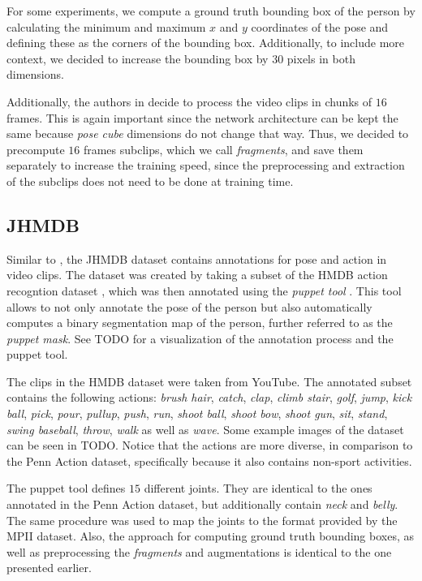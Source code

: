 For some experiments, we compute a ground truth bounding box of the person by calculating the minimum and maximum $x$ and $y$ coordinates of the pose and defining these as the corners of the bounding box.
Additionally, to include more context, we decided to increase the bounding box by $30$ pixels in both dimensions.

Additionally, the authors in \cite{luvizon_2d/3d_2018} decide to process the video clips in chunks of $16$ frames.
This is again important since the network architecture can be kept the same because \textit{pose cube} dimensions do not change that way.
Thus, we decided to precompute $16$ frames subclips, which we call \textit{fragments}, and save them separately to increase the training speed, since the preprocessing and extraction of the subclips does not need to be done at training time. 

\subsection{JHMDB}
\label{sec:exp-jhmdb}

Similar to \cite{zhang_actemes_2013} , the JHMDB dataset \cite{jhuang_towards_2013} contains annotations for pose and action in video clips.
The dataset was created by taking a subset of the HMDB action recogntion dataset \cite{kuehne_hmdb:_2011}, which was then annotated using the \textit{puppet tool} \cite{zuffi_pictorial_2012}.
This tool allows to not only annotate the pose of the person but also automatically computes a binary segmentation map of the person, further referred to as the \textit{puppet mask}.
See TODO for a visualization of the annotation process and the puppet tool.

The clips in the HMDB dataset were taken from YouTube.
The annotated subset contains the following actions:
\textit{brush hair}, \textit{catch}, \textit{clap}, \textit{climb stair}, \textit{golf}, \textit{jump}, \textit{kick ball}, \textit{pick}, \textit{pour}, \textit{pullup}, \textit{push}, \textit{run}, \textit{shoot ball}, \textit{shoot bow}, \textit{shoot gun}, \textit{sit}, \textit{stand}, \textit{swing baseball}, \textit{throw}, \textit{walk} as well as \textit{wave}.
Some example images of the dataset can be seen in TODO.
Notice that the actions are more diverse, in comparison to the Penn Action dataset, specifically because it also contains non-sport activities.

The puppet tool defines $15$ different joints.
They are identical to the ones annotated in the Penn Action dataset, but additionally contain \textit{neck} and \textit{belly}.
The same procedure was used to map the joints to the format provided by the MPII dataset.
Also, the approach for computing ground truth bounding boxes, as well as preprocessing the \textit{fragments} and augmentations is identical to the one presented earlier.

